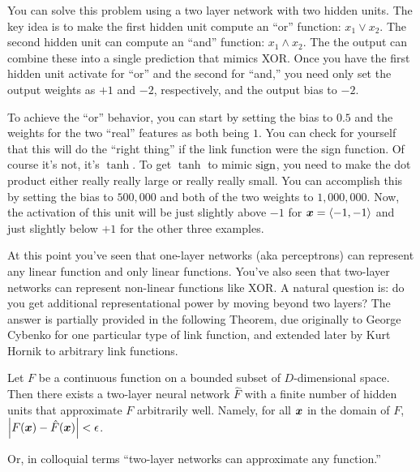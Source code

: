You can solve this problem using a two layer network with two hidden
units.  The key idea is to make the first hidden unit compute an
``or'' function: $x_1 \lor x_2$.  The second hidden unit can compute
an ``and'' function: $x_1 \land x_2$.  The the output can combine
these into a single prediction that mimics XOR.  Once you have the
first hidden unit activate for ``or'' and the second for ``and,'' you
need only set the output weights as $+1$ and $-2$, respectively, and
the output bias to $-2$.


To achieve the ``or'' behavior, you can start by setting the bias to
$0.5$ and the weights for the two ``real'' features as both being
$1$.  You can check for yourself that this will do the ``right thing''
if the link function were the sign function.  Of course it's not, it's
$\tanh$.  To get $\tanh$ to mimic $\textrm{sign}$, you need to make the dot
product either really really large or really really small.  You can
accomplish this by setting the bias to $500,000$ and both of the two
weights to $1,000,000$.  Now, the activation of this unit will be just
slightly above $-1$ for ${\boldsymbol{x}} = \langle -1,-1 \rangle$ and just
slightly below $+1$ for the other three examples.


At this point you've seen that one-layer networks (aka perceptrons)
can represent any linear function and only linear functions.  You've
also seen that two-layer networks can represent non-linear functions
like XOR.  A natural question is: do you get additional
representational power by moving beyond two layers?  The answer is
partially provided in the following Theorem, due originally to George
Cybenko for one particular type of link function, and extended later
by Kurt Hornik to arbitrary link functions.

\begin{theorem} \label{thm:nnet:twolayer}
%
  Let $F$ be a continuous function on a bounded subset of
  $D$-dimensional space.  Then there exists a two-layer neural network
  $\hat F$ with a finite number of hidden units that approximate $F$
  arbitrarily well.  Namely, for all ${\boldsymbol{x}}$ in the domain of $F$,
  $\left\vert F({\boldsymbol{x}}) - \hat F({\boldsymbol{x}}) \right\vert < \epsilon$.
\end{theorem}

Or, in colloquial terms ``two-layer networks can approximate any
function.''

